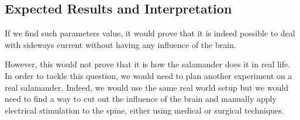 \documentclass{article}
\begin{document}
\subsection{Expected Results and Interpretation}

If we find such parameters value, it would prove that it is indeed possible to deal with sideways current without having any influence of the brain. 

However, this would not prove that it is how the salamander does it in real life. In order to tackle this question, we would need to plan another experiment on a real salamander. Indeed, we would use the same real world setup but we would need to find a way to cut out the influence of the brain and manually apply electrical stimulation to the spine, either using medical or surgical techniques. 











%
%

\printbibliography
\end{document}

